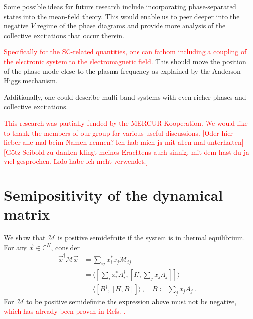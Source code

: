 \documentclass[
    reprint, 
    aps,
    preprintnumbers,
    twocolumn,
    prb,
    superscriptaddress
]{revtex4-2}
\newcommand{\mM}{\mathcal{M}}
\newcommand{\markEdited}{red}
\begin{document}
Some possible ideas for future research include incorporating phase-separated states into the mean-field theory.
This would enable us to peer deeper into the negative $V$ regime of the phase diagrams and provide more analysis of the collective excitations that occur therein.

\textcolor{\markEdited}{Specifically for the SC-related quantities, one can fathom including a coupling of the electronic system to the electromagnetic field.}
This should move the position of the phase mode close to the plasma frequency as explained by the Anderson-Higgs mechanism.

Additionally, one could describe multi-band systems with even richer phases and collective excitations. 


\begin{acknowledgments} 
    \textcolor{\markEdited}{This research was partially funded by the MERCUR Kooperation.
    We would like to thank the members of our group for various useful discussions.
    [Oder hier lieber alle mal beim Namen nennen? Ich hab mich ja mit allen mal unterhalten]
    [Götz Seibold zu danken klingt meines Erachtens auch sinnig, mit dem hast du ja viel gesprochen.
    Lido habe ich nicht verwendet.]}
\end{acknowledgments}

\appendix
\section{Semipositivity of the dynamical matrix}
\label{sec:positive_M}

We show that $\mathcal{M}$ is positive semidefinite if the system is in thermal equilibrium.
For any $\vec{x} \in \mathbb{C}^N$, consider
\begin{align}
    \vec{x}^\dagger \mM \vec{x} &= \sum_{ij} x_i^* x_j \mM_{ij} \nonumber \\
        &= \langle \left[ \sum_i x_i^* A_i^\dagger, \left[ H, \sum_j x_j A_j \right] \right]  \rangle \nonumber \\
        &= \langle [B^\dagger, [H, B]] \rangle\,,\quad B \coloneqq  \sum_j x_j A_j\,.
\end{align}
For $\mM$ to be positive semidefinite the expression above must not be negative,
\textcolor{\markEdited}{which has already been proven in Refs. \cite{Dyson1978,mermin66}.}
\end{document}
